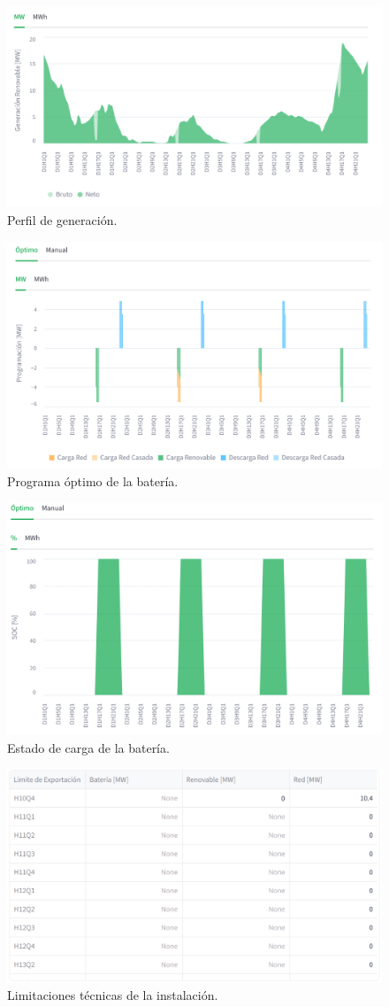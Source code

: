  \begin{figure}
    \centering
    \includegraphics[width=0.75\linewidth]{figures/perfil-generacion.png}
    \caption[Perfil de generación.]{Perfil de generación.}
    \label{fig:perfil-generacion}
  \end{figure}

  \begin{figure}
    \centering
    \includegraphics[width=0.75\linewidth]{figures/programa-optimo.png}
    \caption[Programa óptimo de la batería.]{Programa óptimo de la batería.}
    \label{fig:programa-optimo}
  \end{figure}

  \begin{figure}
    \centering
    \includegraphics[width=0.75\linewidth]{figures/soc-bess.png}
    \caption[Estado de carga de la batería.]{Estado de carga de la batería.}
    \label{fig:soc-bess}
  \end{figure}

  \begin{figure}
    \centering
    \includegraphics[width=0.75\linewidth]{figures/limitaciones-tecnicas.png}
    \caption[Limitaciones técnicas de la instalación.]{Limitaciones técnicas de la instalación.}
    \label{fig:limitaciones-tecnicas}
  \end{figure}
